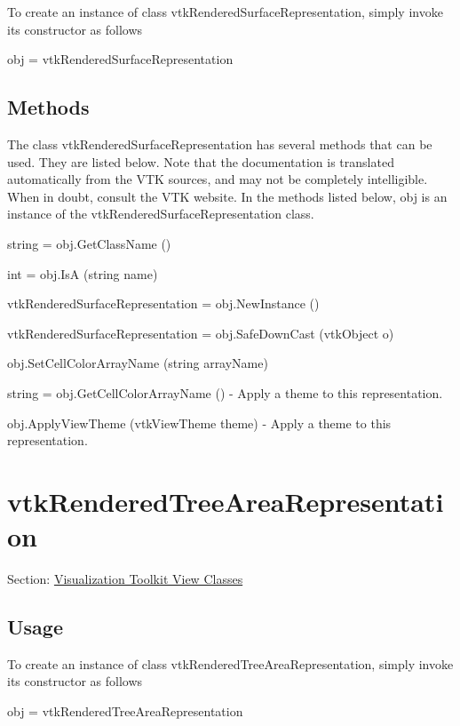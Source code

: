To create an instance of class vtk\-Rendered\-Surface\-Representation, simply invoke its constructor as follows \begin{DoxyVerb}  obj = vtkRenderedSurfaceRepresentation
\end{DoxyVerb}
 \hypertarget{vtkwidgets_vtkxyplotwidget_Methods}{}\subsection{Methods}\label{vtkwidgets_vtkxyplotwidget_Methods}
The class vtk\-Rendered\-Surface\-Representation has several methods that can be used. They are listed below. Note that the documentation is translated automatically from the V\-T\-K sources, and may not be completely intelligible. When in doubt, consult the V\-T\-K website. In the methods listed below, {\ttfamily obj} is an instance of the vtk\-Rendered\-Surface\-Representation class. 
\begin{DoxyItemize}
\item {\ttfamily string = obj.\-Get\-Class\-Name ()}  
\item {\ttfamily int = obj.\-Is\-A (string name)}  
\item {\ttfamily vtk\-Rendered\-Surface\-Representation = obj.\-New\-Instance ()}  
\item {\ttfamily vtk\-Rendered\-Surface\-Representation = obj.\-Safe\-Down\-Cast (vtk\-Object o)}  
\item {\ttfamily obj.\-Set\-Cell\-Color\-Array\-Name (string array\-Name)}  
\item {\ttfamily string = obj.\-Get\-Cell\-Color\-Array\-Name ()} -\/ Apply a theme to this representation.  
\item {\ttfamily obj.\-Apply\-View\-Theme (vtk\-View\-Theme theme)} -\/ Apply a theme to this representation.  
\end{DoxyItemize}\hypertarget{vtkviews_vtkrenderedtreearearepresentation}{}\section{vtk\-Rendered\-Tree\-Area\-Representation}\label{vtkviews_vtkrenderedtreearearepresentation}
Section\-: \hyperlink{sec_vtkviews}{Visualization Toolkit View Classes} \hypertarget{vtkwidgets_vtkxyplotwidget_Usage}{}\subsection{Usage}\label{vtkwidgets_vtkxyplotwidget_Usage}
To create an instance of class vtk\-Rendered\-Tree\-Area\-Representation, simply invoke its constructor as follows \begin{DoxyVerb}  obj = vtkRenderedTreeAreaRepresentation
\end{DoxyVerb}
